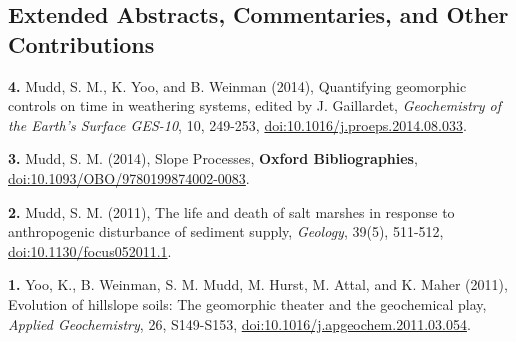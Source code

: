 \documentclass[10pt, a4paper]{article}
\newcommand{\years}[1]{\marginnote{\scriptsize #1}}
\begin{document}
\subsection*{Extended Abstracts, Commentaries, and Other Contributions}
\noindent
\years{2014}\hangindent=0.7cm\textbf{4.} Mudd, S. M., K. Yoo, and B. Weinman (2014), Quantifying geomorphic controls on time in weathering systems, edited by J. Gaillardet, \textit{Geochemistry of the Earth's Surface GES-10}, 10, 249-253, \href{http://dx.doi.org/doi:10.1016/j.proeps.2014.08.033}{doi:10.1016/j.proeps.2014.08.033}.\par
\hangindent=0.7cm\textbf{3.} Mudd, S. M. (2014), Slope Processes, \textbf{Oxford Bibliographies}, \href{http://dx.doi.org/doi:10.1093/OBO/9780199874002-0083}{doi:10.1093/OBO/9780199874002-0083}.\par 
\years{2011}\hangindent=0.7cm\textbf{2.} Mudd, S. M. (2011), The life and death of salt marshes in response to anthropogenic disturbance of sediment supply, \textit{Geology}, 39(5), 511-512, \href{http://dx.doi.org/doi:10.1130/focus052011.1}{doi:10.1130/focus052011.1}.\par
\years{2009}\hangindent=0.7cm\textbf{1.} Yoo, K., B. Weinman, S. M. Mudd, M. Hurst, M. Attal, and K. Maher (2011), Evolution of hillslope soils: The geomorphic theater and the geochemical play, \textit{Applied Geochemistry}, 26, S149-S153, \href{http://dx.doi.org/doi:10.1016/j.apgeochem.2011.03.054}{doi:10.1016/j.apgeochem.2011.03.054}.\par

\vfill{}
\end{document}
